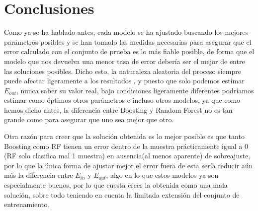\documentclass{article}
\begin{document}
	\section{Conclusiones}
	Como ya se ha hablado antes, cada modelo se ha ajustado buscando los mejores parámetros posibles y se han tomado las medidas necesarias para asegurar que el error calculado con el conjunto de prueba es lo más fiable posible, de forma que el modelo que nos devuelva una menor tasa de error debería ser el mejor de entre las soluciones posibles. Dicho esto, la naturaleza aleatoria del proceso siempre puede afectar ligeramente a los resultados , y puesto que solo podemos estimar $E_{out}$, nunca saber su valor real, bajo condiciones ligeramente diferentes podríamos estimar como óptimos otros parámetros e incluso otros modelos, ya que como hemos dicho antes, la diferencia entre Boosting y Random Forest no es tan grande como para asegurar que uno sea mejor que otro.
	\par 
	Otra razón para creer que la solución obtenida es lo mejor posible es que tanto Boosting como RF tienen un error dentro de la muestra prácticamente igual a 0 (RF solo clasifica mal 1 muestra) en ausencia(al menos aparente) de sobreajuste, por lo que la única forma de ajustar mejor el error fuera de esta sería reducir aún más la diferencia entre $E_{in}$ y $E_{out}$, algo en lo que estos modelos ya son especialmente buenos, por lo que cuesta creer la obtenida como una mala solución, sobre todo teniendo en cuenta la limitada extensión del conjunto de entrenamiento.
	
	
\end{document}
